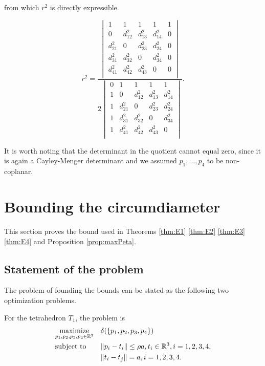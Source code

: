 from which $r^2$ is directly expressible.

\begin{equation}\label{eq:Cayley-Menger-expanded}
r^2 
=
\frac{
\begin{vmatrix}
1 & 1 & 1 & 1 & 1 \\
0 & d^2_{12} & d^2_{13} & d^2_{14} & 0 \\
d^2_{21} & 0 & d^2_{23} & d^2_{24} & 0 \\
d^2_{31} & d^2_{32} & 0 & d^2_{34} & 0 \\ 
d^2_{41} & d^2_{42} & d^2_{43} & 0 & 0 \\
\end{vmatrix}}
{2 \begin{vmatrix}
0 & 1 & 1 & 1 & 1 \\
1 & 0 & d^2_{12} & d^2_{13} & d^2_{14} \\
1 & d^2_{21} & 0 & d^2_{23} & d^2_{24} \\
1 & d^2_{31} & d^2_{32} & 0 & d^2_{34} \\ 
1 & d^2_{41} & d^2_{42} & d^2_{43} & 0 \\
\end{vmatrix} 
}.
\end{equation}

It is worth noting that the determinant in the quotient cannot equal zero, since it is again a Cayley-Menger determinant and we assumed $p_1,\dots,p_4$ to be non-coplanar. 



\section{Bounding the circumdiameter}\label{sec:boundingdiameter}
This section proves the bound used in Theorems \ref{thm:E1} \ref{thm:E2} \ref{thm:E3} \ref{thm:E4} and Proposition \ref{prop:maxPeta}. 

\subsection{Statement of the problem}

The problem of founding the bounds can be stated as the following two optimization problems. \newline

\noindent For the tetrahedron $T_1$, the problem is 
\begin{equation}\label{prob:tetra1}
\begin{aligned}
& \underset{p_1,p_2,p_3,p_4\in {\mathbb R^3}}{\text{maximize}}
& & \delta(\{p_1,p_2,p_3,p_4\}) \\
& \text{subject to}
& & \| p_i - t_i\| \leq \rho a, t_i\in {\mathbb R^3}, i=1,2,3,4, \\
& & &\|t_i - t_j\| = a, i=1,2,3,4. 
\end{aligned}
\end{equation}

